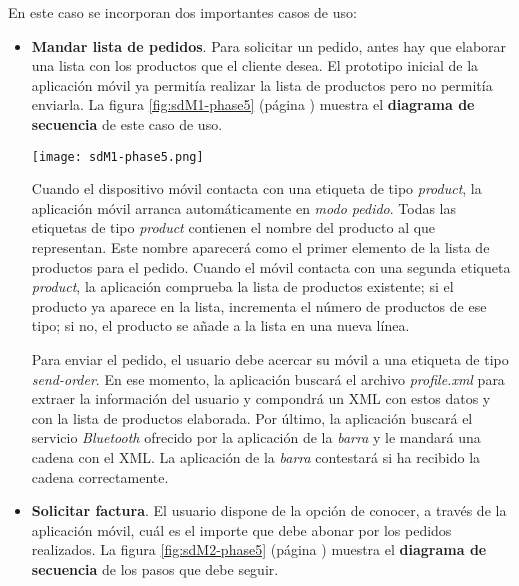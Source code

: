En este caso se incorporan dos importantes casos de uso:
\begin{itemize}
\item \textbf{Mandar lista de pedidos}. Para solicitar un pedido, antes hay
que elaborar una lista con los productos que el cliente desea. El prototipo
inicial de la aplicación móvil ya permitía realizar la lista de productos
pero no permitía enviarla. La figura \ref{fig:sdM1-phase5} (página
\pageref{fig:sdM1-phase5}) muestra el \textbf{diagrama de secuencia} de este
caso de uso.

  \begin{sidewaysfigure}[!h]
    \begin{center}
      \texttt{[image: sdM1-phase5.png]}
      \caption{Diagrama de secuencia del caso de uso \emph{mandar lista
      de pedidos}. En este caso el cliente solicita dos productos.}
      \label{fig:sdM1-phase5}
    \end{center}
  \end{sidewaysfigure}

Cuando el dispositivo móvil contacta con una etiqueta de tipo \emph{product},
la aplicación móvil arranca automáticamente en \emph{modo pedido}. Todas las
etiquetas de tipo \emph{product} contienen el nombre del producto al que
representan. Este nombre aparecerá como el primer elemento de la lista de
productos para el pedido. Cuando el móvil contacta con una segunda etiqueta
\emph{product}, la aplicación comprueba la lista de productos existente; si
el producto ya aparece en la lista, incrementa el número de productos de ese
tipo; si no, el producto se añade a la lista en una nueva línea.

Para enviar el pedido, el usuario debe acercar su móvil a una etiqueta de
tipo \emph{send-order}. En ese momento, la aplicación buscará el archivo
\emph{profile.xml} para extraer la información del usuario y compondrá un
\acs{XML} con estos datos y con la lista de productos elaborada. Por último,
la aplicación buscará el servicio \emph{Bluetooth} ofrecido por la aplicación
de la \emph{barra} y le mandará una cadena con el \acs{XML}. La aplicación
de la \emph{barra} contestará si ha recibido la cadena correctamente.

\item \textbf{Solicitar factura}. El usuario dispone de la opción de conocer,
a través de la aplicación móvil, cuál es el importe que debe abonar por los
pedidos realizados. La figura \ref{fig:sdM2-phase5} (página
\pageref{fig:sdM2-phase5}) muestra el \textbf{diagrama de secuencia} de los
pasos que debe seguir.


\end{itemize}
